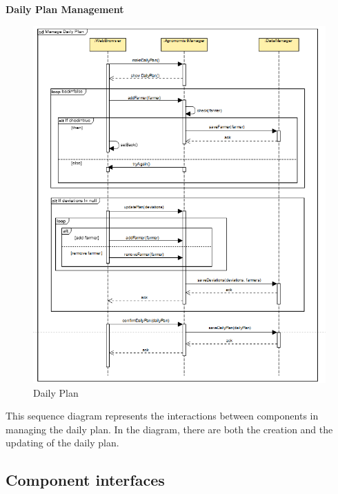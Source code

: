 \documentclass[table, 12pt]{article}
\begin{document}
\newpage
\textbf{Daily Plan Management}
\begin{center}
    \begin{figure}[H]
        
        \includegraphics[scale=0.55, center]{assets/SequenceDiagram/ManageDailyPlan.png}
        \caption{Daily Plan}
        \label{fig: dailyPlan}
    \end{figure}
\end{center}
This sequence diagram represents the interactions between components in managing the daily plan.
In the diagram, there are both the creation and the updating of the daily plan.


\subsection{Component interfaces}
\end{document}
